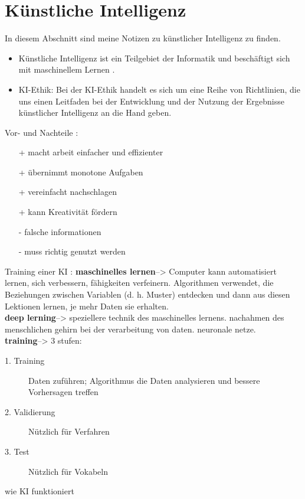 \section{Künstliche Intelligenz}
\label{sec:ai}

In diesem Abschnitt sind meine Notizen zu künstlicher Intelligenz zu finden.

\begin{itemize}
    \item Künstliche Intelligenz ist ein Teilgebiet der Informatik und beschäftigt sich mit maschinellem Lernen \citep{ai-wikipedia}.
    \item KI-Ethik: Bei der KI-Ethik handelt es sich um eine Reihe von Richtlinien, die uns einen Leitfaden bei der Entwicklung und der Nutzung der Ergebnisse künstlicher Intelligenz an die Hand geben. \citep{ibm}
\end{itemize}

Vor- und Nachteile \citep{GitHub}:
\begin{itemize}
    \item[+] macht arbeit einfacher und effizienter
    \item[+] übernimmt monotone Aufgaben
    \item[+] vereinfacht nachschlagen
    \item[+] kann Kreativität fördern
    \item[-] falsche informationen
    \item[-] muss richtig genutzt werden
\end{itemize}

\bigskip

Training einer KI \citep{KI-Training}:
\textbf{maschinelles lernen}--> Computer kann automatisiert lernen, sich verbessern, fähigkeiten verfeinern.
Algorithmen verwendet, die Beziehungen zwischen Variablen (d. h. Muster) entdecken und dann aus diesen Lektionen lernen, je mehr Daten sie erhalten.\\
\textbf{deep lerning}--> speziellere technik des maschinelles lernens. nachahmen des menschlichen gehirn bei der verarbeitung von daten. neuronale netze.\\

\textbf{training}--> 3 stufen:
\begin{description}
    \item[1. Training] Daten zuführen; Algorithmus die Daten analysieren und bessere Vorhersagen treffen
    \item[2. Validierung] Nützlich für Verfahren
    \item[3. Test] Nützlich für Vokabeln
    \end{description}


\bigskip

wie KI funktioniert
